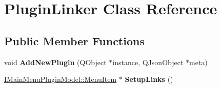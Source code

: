 \hypertarget{class_plugin_linker}{}\section{Plugin\+Linker Class Reference}
\label{class_plugin_linker}
\subsection*{Public Member Functions}
\begin{DoxyCompactItemize}
\item 
\mbox{\label{class_plugin_linker_a864d8fa78e948711e62a3985f57e2315}} 
void {\bfseries Add\+New\+Plugin} (Q\+Object $\ast$instance, Q\+Json\+Object $\ast$meta)
\item 
\mbox{\label{class_plugin_linker_ad47aca648a1bd5dfd75d0829f7bacc16}} 
\hyperlink{struct_i_main_menu_plugin_model_1_1_menu_item}{I\+Main\+Menu\+Plugin\+Model\+::\+Menu\+Item} $\ast$ {\bfseries Setup\+Links} ()
\end{DoxyCompactItemize}
